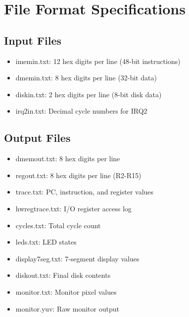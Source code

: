\documentclass{article}
\begin{document}
\section{File Format Specifications}
\subsection{Input Files}
\begin{itemize}
    \item imemin.txt: 12 hex digits per line (48-bit instructions)
    \item dmemin.txt: 8 hex digits per line (32-bit data)
    \item diskin.txt: 2 hex digits per line (8-bit disk data)
    \item irq2in.txt: Decimal cycle numbers for IRQ2
\end{itemize}

\subsection{Output Files}
\begin{itemize}
    \item dmemout.txt: 8 hex digits per line
    \item regout.txt: 8 hex digits per line (R2-R15)
    \item trace.txt: PC, instruction, and register values
    \item hwregtrace.txt: I/O register access log
    \item cycles.txt: Total cycle count
    \item leds.txt: LED states
    \item display7seg.txt: 7-segment display values
    \item diskout.txt: Final disk contents
    \item monitor.txt: Monitor pixel values
    \item monitor.yuv: Raw monitor output
\end{itemize}
\end{document}
